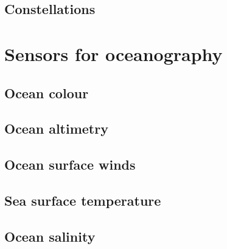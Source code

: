 \lipsum

\subsection{Constellations}
\label{subsec:Constellations}

\lipsum
    

\section{Sensors for oceanography}
\label{sec:Oceanography_Sensors}

\lipsum

\subsection{Ocean colour}
\label{subsec:Ocean_colour}

\lipsum

\subsection{Ocean altimetry}
\label{subsec:Ocean_altimetry}

\lipsum

\subsection{Ocean surface winds}
\label{subsec:Ocean_winds}

\lipsum

\subsection{Sea surface temperature}
\label{subsec:Ocean_temperature}

\lipsum

\subsection{Ocean salinity}
\label{subsec:Ocean_salinity}

\lipsum


